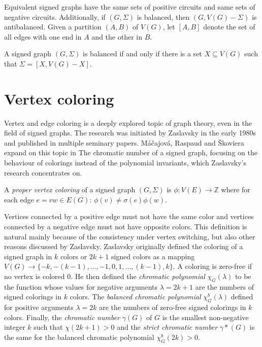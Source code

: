 Equivalent signed graphs have the same sets of positive circuits and same sets of negative circuits.
Additionally, if $(G, \Sigma)$ is balanced, then $(G, V(G) - \Sigma)$ is antibalanced.
Given a partition $(A, B)$ of $V(G)$, let $[A, B]$ denote the set of all edges with one end in $A$ and the other in $B$.

\begin{theorem}\label{vertex-set-partition}
    A signed graph $(G, \Sigma)$ is balanced if and only if there is a set $X \subseteq V(G)$ such that $\Sigma = [X, V(G) - X]$.
\end{theorem}

\section{Vertex coloring}

Vertex and edge coloring is a deeply explored topic of graph theory, even in the field of signed graphs.
The research was initiated by Zaslavsky\cite{zaslavsky-graphs} in the early 1980s and published in multiple seminary papers\cite{zaslavsky-invariants,zaslavsky-coloring,zaslavsky-colorful}.
Máčajová, Raspaud and Škoviera expand on this topic in The chromatic number of a signed graph\cite{chromatic-number},
focusing on the behaviour of colorings instead of the polynomial invariants, which Zaslavsky's research concentrates on.

\begin{definition}[Zaslavsky]
    A \textit{proper vertex coloring} of a signed graph $(G, \Sigma)$ is 
    $\phi : V(E) \rightarrow \mathbb{Z}$
    where for each edge $e = vw \in E(G)$: $\phi (v) \neq \sigma (e) \phi (w)$.
\end{definition}

Vertices connected by a positive edge must not have the same color and vertices connected by a negative edge must not have opposite colors.
This definition is natural mainly because of the consistency under vertex switching, but also other reasons discussed by Zaslavsky.
Zaslavsky originally defined the coloring of a signed graph in $k$ colors or $2k+1$ signed colors as 
a mapping $V(G) \rightarrow \{-k, -(k-1), \dots, -1,0,1, \dots , (k-1), k\}$. 
A coloring is zero-free if no vertex is colored 0. He then defined the \textit{chromatic polynomial} $\chi _G (\lambda)$ to be the function
whose values for negative arguments $\lambda = 2k + 1$ are the numbers of signed colorings in $k$ colors. The \textit{balanced chromatic polynomial}
$\chi _G ^b (\lambda)$ defined
for positive arguments $\lambda = 2k$ are the numbers of zero-free signed colorings in $k$ colors.
Finally, the \textit{chromatic number} $\gamma(G)$ of $G$ is the smallest non-negative integer $k$ such that $\chi (2k+1) > 0$ and the \textit{strict chromatic number} $\gamma * (G)$ is the 
same for the balanced chromatic polynomial $\chi _G ^b (2k) > 0$.

